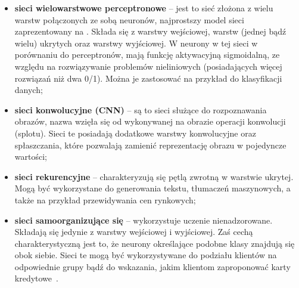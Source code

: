 \begin{itemize}
    \item \textbf{sieci wielowarstwowe perceptronowe} -- jest to sieć złożona z wielu warstw połączonych ze sobą neuronów, najprostszy model sieci zaprezentowany na . Składa się z warstwy wejściowej, warstw (jednej bądź wielu) ukrytych oraz warstwy wyjściowej. W neurony w tej sieci w porównaniu do perceptronów, mają funkcję aktywacyjną sigmoidalną, ze względu na rozwiązywanie problemów nieliniowych (posiadających więcej rozwiązań niż dwa 0/1). Można je zastosować na przykład do klasyfikacji danych;
    \item \textbf{sieci konwolucyjne (CNN)} -- są to sieci służące do rozpoznawania obrazów, nazwa wzięła się od wykonywanej na obrazie operacji konwolucji (splotu). Sieci te posiadają dodatkowe warstwy konwolucyjne oraz spłaszczania, które pozwalają zamienić reprezentację obrazu w pojedyncze wartości;
    \item \textbf{sieci rekurencyjne} -- charakteryzują się pętlą zwrotną w warstwie ukrytej. Mogą być wykorzystane do generowania tekstu, tłumaczeń maszynowych, a także na przykład przewidywania cen rynkowych;
    \item \textbf{sieci samoorganizujące się} -- wykorzystuje uczenie nienadzorowane. Składają się jedynie z warstwy wejściowej i wyjściowej. Zaś cechą charakterystyczną jest to, że neurony określające podobne klasy znajdują się obok siebie. Sieci te mogą być wykorzystywane do podziału klientów na odpowiednie grupy bądź do wskazania, jakim klientom zaproponować karty kredytowe~\cite{IBMNetwork, BartosSOM}.
\end{itemize}

